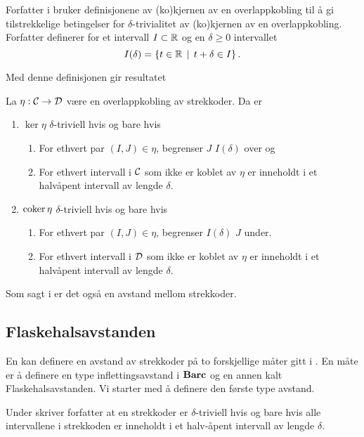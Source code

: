 Forfatter i \citep{Bauer2020} bruker definisjonene av
(ko)kjernen av en overlappkobling til å gi tilstrekkelige
betingelser for $\delta$-trivialitet av (ko)kjernen av en
overlappkobling. Forfatter definerer for et intervall
$I\subset \mathbb{R}$ og en $\delta\geq0$ intervallet
\[I(\delta) = \left\{t\in\mathbb{R}\,\mid\,t+\delta\in I\right\}.\]

Med denne definisjonen gir \citep{Bauer2020} resultatet

\begin{proposisjon}
  La $\eta: \mathcal{C}\to\mathcal{D}$ være en overlappkobling av strekkoder. Da er
  \begin{enumerate}
    \item $\ker\eta$ $\delta$-triviell hvis og bare hvis
    \begin{enumerate}
      \item For ethvert par $(I,J)\in\eta$, begrenser $J$ $I(\delta)$ over og
      \item For ethvert intervall i $\mathcal{C}$ som ikke er koblet av $\eta$ er inneholdt i et halvåpent intervall av lengde $\delta$.
    \end{enumerate}
    \item $\textnormal{coker}\,\eta$ $\delta$-triviell hvis og bare hvis
    \begin{enumerate}
      \item For ethvert par $(I,J)\in\eta$, begrenser $I(\delta)$ $J$ under.
      \item For ethvert intervall i $\mathcal{D}$ som ikke er koblet av $\eta$ er inneholdt i et halvåpent intervall av lengde $\delta$.
    \end{enumerate}
  \end{enumerate}
\end{proposisjon}
\bevis{

}

Som sagt i  er det også en
avstand mellom strekkoder.

\subsection{Flaskehalsavstanden}
En kan definere en avstand av strekkoder på to
forskjellige måter gitt i \cite{Bauer2020}. En måte er
å definere en type inflettingsavstand i $\textnormal{\textbf{Barc}}$ og en annen
kalt Flaskehalsavstanden. Vi starter med å definere den
første type avstand.

\begin{bemerk}\label{bem:strek_triv}
  Under \citep[definisjon 1.3]{Bauer2020} skriver
  forfatter at en strekkoder er $\delta$-triviell hvis og
  bare hvis alle intervallene i strekkoden er inneholdt
  i et halv-åpent intervall av lengde $\delta$.
\end{bemerk}

